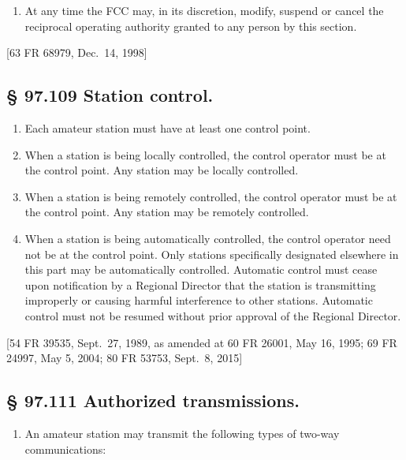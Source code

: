 \documentclass[
  letterpaper,
  DIV=11,
  numbers=noendperiod]{scrreport}
\providecommand{\tightlist}{%
  \setlength{\itemsep}{0pt}\setlength{\parskip}{0pt}}\usepackage{longtable,booktabs,array}
\begin{document}
\begin{enumerate}
\def\labelenumi{(\alph{enumi})}
\setcounter{enumi}{2}
\tightlist
\item
  At any time the FCC may, in its discretion, modify, suspend or cancel
  the reciprocal operating authority granted to any person by this
  section.
\end{enumerate}

{[}63 FR 68979, Dec.~14, 1998{]}

\hypertarget{station-control.}{%
\subsection*{§ 97.109 Station control.}\label{station-control.}}

\begin{enumerate}
\def\labelenumi{(\alph{enumi})}
\item
  Each amateur station must have at least one control point.
\item
  When a station is being locally controlled, the control operator must
  be at the control point. Any station may be locally controlled.
\item
  When a station is being remotely controlled, the control operator must
  be at the control point. Any station may be remotely controlled.
\item
  When a station is being automatically controlled, the control operator
  need not be at the control point. Only stations specifically
  designated elsewhere in this part may be automatically controlled.
  Automatic control must cease upon notification by a Regional Director
  that the station is transmitting improperly or causing harmful
  interference to other stations. Automatic control must not be resumed
  without prior approval of the Regional Director.
\end{enumerate}

{[}54 FR 39535, Sept.~27, 1989, as amended at 60 FR 26001, May 16, 1995;
69 FR 24997, May 5, 2004; 80 FR 53753, Sept.~8, 2015{]}

\hypertarget{97.111}{%
\subsection*{§ 97.111 Authorized transmissions.}\label{97.111}}

\begin{enumerate}
\def\labelenumi{(\alph{enumi})}
\tightlist
\item
  An amateur station may transmit the following types of two-way
  communications:
\end{enumerate}
\end{document}
